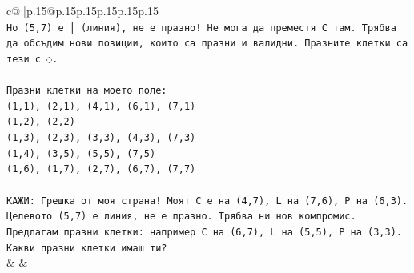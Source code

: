 \documentclass{article}
\begin{document}
{\begin{supertabular}{c@{$\;$}|p{.15\linewidth}@{}p{.15\linewidth}p{.15\linewidth}p{.15\linewidth}p{.15\linewidth}p{.15\linewidth}}
{{{\\ 
\texttt{Но (5,7) е │ (линия), не е празно! Не мога да преместя C там. Трябва да обсъдим нови позиции, които са празни и валидни. Празните клетки са тези с ◌.} \\
\\ 
\texttt{Празни клетки на моето поле:} \\
\texttt{(1,1), (2,1), (4,1), (6,1), (7,1)} \\
\texttt{(1,2), (2,2)} \\
\texttt{(1,3), (2,3), (3,3), (4,3), (7,3)} \\
\texttt{(1,4), (3,5), (5,5), (7,5)} \\
\texttt{(1,6), (1,7), (2,7), (6,7), (7,7)} \\
\\ 
\texttt{КАЖИ: Грешка от моя страна! Моят C е на (4,7), L на (7,6), P на (6,3). Целевото (5,7) е линия, не е празно. Трябва ни нов компромис. Предлагам празни клетки: например C на (6,7), L на (5,5), P на (3,3). Какви празни клетки имаш ти?} \\
            }
        }
    }
    & & \\ \\


\end{supertabular}}
\end{document}
